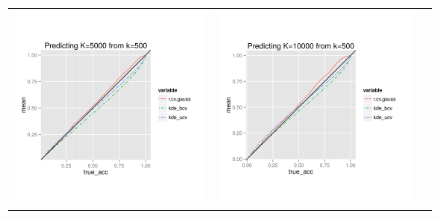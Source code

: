 \documentclass[twoside,11pt]{article}
\begin{document}
\begin{figure}
\begin{tabular}{ccc}
\includegraphics[scale = 0.45, clip = true, trim = .5in 0 1.25in 1.03in]{sim_large7_bias_K5_k0_5.png} &
\includegraphics[scale = 0.45, clip = true, trim = .5in 0 0.00in 1.03in]{sim_large7_bias_K10_k0_5.png}\\ 

\end{tabular}
\end{figure}
\end{document}
